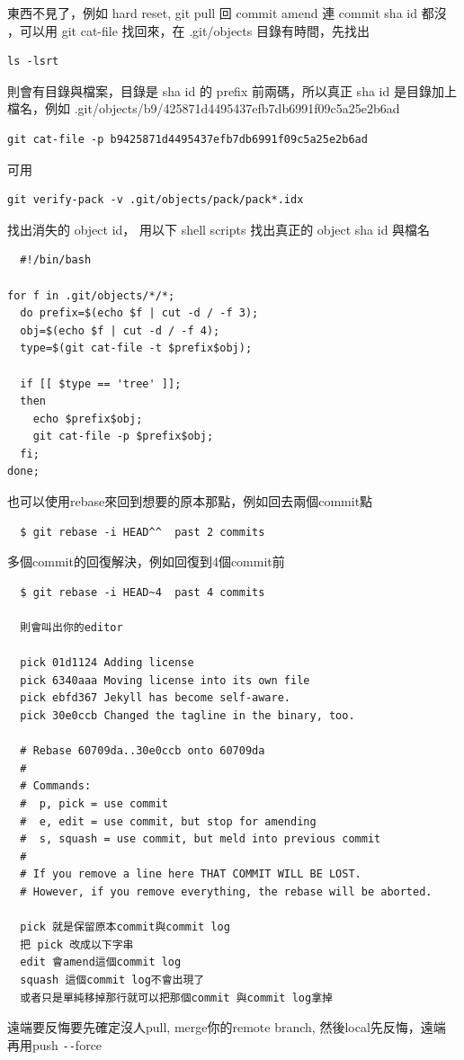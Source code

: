   東西不見了，例如 hard reset, git pull 回 commit amend 連 commit sha id 都沒
  ，可以用 git cat-file 找回來，在 .git/objects 目錄有時間，先找出
  \begin{verbatim}
ls -lsrt
  \end{verbatim}
  則會有目錄與檔案，目錄是 sha id 的 prefix 前兩碼，所以真正 sha id 是目錄加上
  檔名，例如 .git/objects/b9/425871d4495437efb7db6991f09c5a25e2b6ad
  \begin{verbatim}
git cat-file -p b9425871d4495437efb7db6991f09c5a25e2b6ad
  \end{verbatim}
  可用
  \begin{verbatim}
git verify-pack -v .git/objects/pack/pack*.idx
  \end{verbatim}
  找出消失的 object id，
  用以下 shell scripts 找出真正的 object sha id 與檔名
  \begin{verbatim}
  #!/bin/bash

for f in .git/objects/*/*;
  do prefix=$(echo $f | cut -d / -f 3);
  obj=$(echo $f | cut -d / -f 4);
  type=$(git cat-file -t $prefix$obj);

  if [[ $type == 'tree' ]];
  then
    echo $prefix$obj;
    git cat-file -p $prefix$obj;
  fi;
done;
  \end{verbatim}
  也可以使用rebase來回到想要的原本那點，例如回去兩個commit點
  \begin{verbatim}
  $ git rebase -i HEAD^^  past 2 commits
  \end{verbatim}
  多個commit的回復解決，例如回復到4個commit前
  \begin{verbatim}
  $ git rebase -i HEAD~4  past 4 commits

  則會叫出你的editor

  pick 01d1124 Adding license
  pick 6340aaa Moving license into its own file
  pick ebfd367 Jekyll has become self-aware.
  pick 30e0ccb Changed the tagline in the binary, too.

  # Rebase 60709da..30e0ccb onto 60709da
  #
  # Commands:
  #  p, pick = use commit
  #  e, edit = use commit, but stop for amending
  #  s, squash = use commit, but meld into previous commit
  #
  # If you remove a line here THAT COMMIT WILL BE LOST.
  # However, if you remove everything, the rebase will be aborted.

  pick 就是保留原本commit與commit log
  把 pick 改成以下字串
  edit 會amend這個commit log
  squash 這個commit log不會出現了
  或者只是單純移掉那行就可以把那個commit 與commit log拿掉
  \end{verbatim}
  遠端要反悔要先確定沒人pull, merge你的remote branch, 然後local先反悔，遠端
  再用push \verb=--=force
